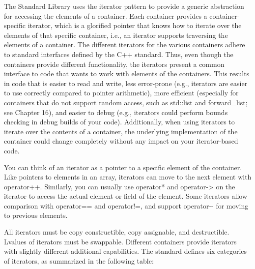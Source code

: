 
The Standard Library uses the iterator pattern to provide a generic abstraction for accessing the elements of a container. Each container provides a container-specific iterator, which is a glorified pointer that knows how to iterate over the elements of that specific container, i.e., an iterator supports traversing the elements of a container. The different iterators for the various containers adhere to standard interfaces defined by the C++ standard. Thus, even though the containers provide different functionality, the iterators present a common interface to code that wants to work with elements of the containers. This results in code that is easier to read and write, less error-prone (e.g., iterators are easier to use correctly compared to pointer arithmetic), more efficient (especially for containers that do not support random access, such as std::list and forward\_list; see Chapter 16), and easier to debug (e.g., iterators could perform bounds checking in debug builds of your code). Additionally, when using iterators to iterate over the contents of a container, the underlying implementation of the container could change completely without any impact on your iterator-based code.

You can think of an iterator as a pointer to a specific element of the container. Like pointers to elements in an array, iterators can move to the next element with operator++. Similarly, you can usually use operator* and operator-> on the iterator to access the actual element or field of the element. Some iterators allow comparison with operator== and operator!=, and support operator-{}- for moving to previous elements.

All iterators must be copy constructible, copy assignable, and destructible. Lvalues of iterators must be swappable. Different containers provide iterators with slightly different additional capabilities. The standard defines six categories of iterators, as summarized in the following table:

